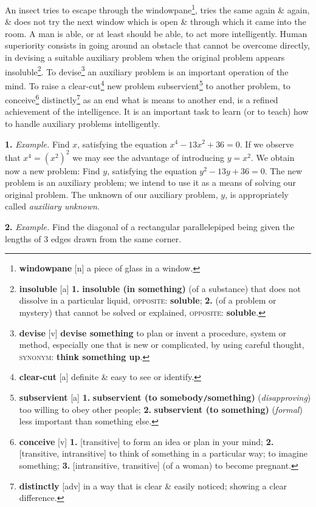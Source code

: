 \documentclass[oneside]{book}
\numberwithin{equation}{section}
\begin{document}
An insect tries to escape through the windowpane\footnote{\textbf{windowpane} [n] a piece of glass in a window.}, tries the same again \& again, \& does not try the next window which is open \& through which it came into the room. A man is able, or at least should be able, to act more intelligently. Human superiority consists in going around an obstacle that cannot be overcome directly, in devising a suitable auxiliary problem when the original problem appears insoluble\footnote{\textbf{insoluble} [a] \textbf{1.} \textbf{insoluble (in something)} (of a substance) that does not dissolve in a particular liquid, \textsc{opposite}: \textbf{soluble}; \textbf{2.} (of a problem or mystery) that cannot be solved or explained, \textsc{opposite}: \textbf{soluble}.}. To devise\footnote{\textbf{devise} [v] \textbf{devise something} to plan or invent a procedure, system or method, especially one that is new or complicated, by using careful thought, \textsc{synonym}: \textbf{think something up}.} an auxiliary problem is an important operation of the mind. To raise a clear-cut\footnote{\textbf{clear-cut} [a] definite \& easy to see or identify.} new problem subservient\footnote{\textbf{subservient} [a] \textbf{1.} \textbf{subservient (to somebody\texttt{/}something)} (\textit{disapproving}) too willing to obey other people; \textbf{2.} \textbf{subservient (to something)} (\textit{formal}) less important than something else.} to another problem, to conceive\footnote{\textbf{conceive} [v] \textbf{1.} [transitive] to form an idea or plan in your mind; \textbf{2.} [transitive, intransitive] to think of something in a particular way; to imagine something; \textbf{3.} [intransitive, transitive] (of a woman) to become pregnant.} distinctly\footnote{\textbf{distinctly} [adv] in a way that is clear \& easily noticed; showing a clear difference.} as an end what is means to another end, is a refined achievement of the intelligence. It is an important task to learn (or to teach) how to handle auxiliary problems intelligently.

\textbf{1.} \textit{Example.} Find $x$, satisfying the equation $x^4 - 13x^2 + 36 = 0$. If we observe that $x^4 = (x^2)^2$ we may see the advantage of introducing $y = x^2$. We obtain now a new problem: Find $y$, satisfying the equation $y^2 - 13y + 36 = 0$. The new problem is an auxiliary problem; we intend to use it as a means of solving our original problem. The unknown of our auxiliary problem, $y$, is appropriately called \textit{auxiliary unknown}.

\textbf{2.} \textit{Example.} Find the diagonal of a rectangular parallelepiped being given the lengths of 3 edges drawn from the same corner.
\end{document}
